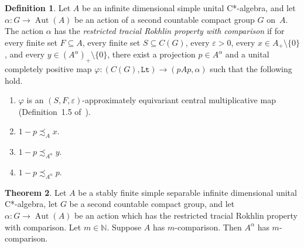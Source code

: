 \documentclass[10pt]{amsart}
\newcounter{TmpEnumi}
\numberwithin{equation}{section}
\theoremstyle{definition}
\newtheorem{thm}{Theorem}[section]
\newtheorem{dfn}[thm]{Definition}
\newcommand{\Aut}{{\operatorname{Aut}}}
\newcommand{\ca}{C*-algebra}
\begin{document}
\begin{dfn}\label{traR}
Let $A$ be an infinite dimensional simple unital \ca,
and let $\alpha \colon G \to \Aut (A)$ be
an action of a second countable compact group $G$ on~$A$.
The action $\alpha$ has the
\emph{restricted tracial Rokhlin property with comparison}
if for every finite set $F \subseteq A$,
every finite set $S \subseteq C (G)$,
every $\varepsilon > 0$, every $x \in A_{+} \setminus \{ 0 \}$,
and every $y \in (A^{\alpha})_{+} \setminus \{ 0 \}$,
there exist a projection $p \in A^{\alpha}$ and a
unital completely positive map
$\varphi \colon (C (G), \mathtt{Lt}) \to (p A p, \alpha)$
such that the following hold.
%
\begin{enumerate}
%
\item\label{Item_893_FS_equi_cen_multi_approx}
$\varphi$ is an $(S, F, \varepsilon)$-approximately equivariant
central multiplicative map (Definition~1.5 of~\cite{MohPhil2021TRP}).
%
\item\label{1_pxcompactsets}
$1 - p \precsim_{A} x$.
%
\item\label{1_pycompactsets}
$1 - p \precsim_{A^{\alpha}} y$.
%
\item\label{1_ppcompactsets}
$1 - p \precsim_{A^{\alpha}} p$.
\setcounter{TmpEnumi}{\value{enumi}}
%
\end{enumerate}
%
\end{dfn}

\begin{thm}\label{ComparisonTRP}
Let $A$ be a stably finite simple separable infinite dimensional
unital C*-algebra,
let $G$ be a second countable compact group, and let
$\alpha \colon G \to \Aut (A)$ be an action
which has the restricted tracial Rokhlin property with comparison.
Let $m \in \mathbb{N}$.
Suppose $A$ has $m$-comparison.
Then $A^{\alpha}$ has $m$-comparison.
\end{thm}
\end{document}
